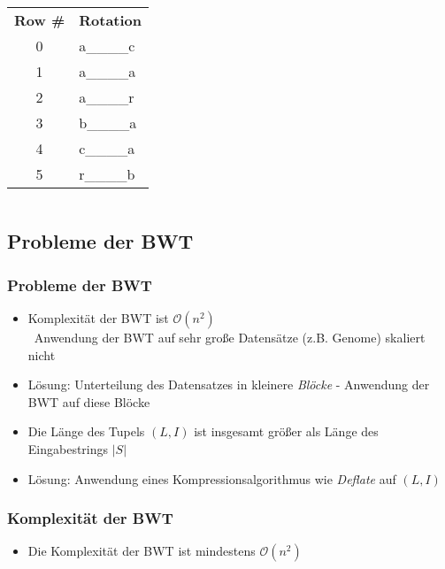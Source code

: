 \documentclass[14pt,xcolor=dvipsnames]{beamer}
\begin{document}
\begin{frame}[allowframebreaks]
\begin{columns}[c,onlytextwidth]
    \begin{tabular}{c|l}
    \textbf{Row \#} & \textbf{Rotation} \\
    0 & {\color{darkgreen}a}\_\_\_\_c\\
    1 & {\color{darkgreen}a}\_\_\_\_a\\
    2 & {\color{darkgreen}a}\_\_\_\_r\\
    3 & {\color{darkgreen}b}\_\_\_\_a\\
    4 & {\color{darkgreen}c}\_\_\_\_a\\
    5 & {\color{darkgreen}r}\_\_\_\_b\\
    \end{tabular}
\end{columns}
\end{frame}
\subsection{Probleme der BWT}
\begin{frame}[allowframebreaks]
 \frametitle{Probleme der BWT}
 \begin{itemize}
  \item Komplexität der BWT ist $\mathcal{O}(n^2)$\\
    \textrightarrow \ Anwendung der BWT auf sehr große Datensätze (z.B. Genome) skaliert nicht
    \pause
  \item Lösung: Unterteilung des Datensatzes in kleinere \textit{Blöcke} - Anwendung der BWT auf diese Blöcke
 \end{itemize}
 
\framebreak
 \begin{itemize}
  \item Die Länge des Tupels $(L,I)$ ist insgesamt größer als Länge des Eingabestrings $|S|$
  \pause
  \item Lösung: Anwendung eines Kompressionsalgorithmus wie \textit{Deflate} auf $(L,I)$
  \end{itemize}
\end{frame}
\begin{frame}
 \frametitle{Komplexität der BWT}
 \begin{itemize}
  \item Die Komplexität der BWT ist mindestens $\mathcal{O}(n^2)$
 \end{itemize}
\end{frame}
\end{document}
